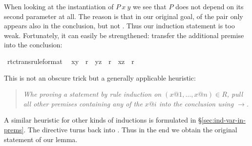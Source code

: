 \begin{isabellebody}
\begin{isamarkuptext}
When looking at the instantiation of $P~x~y$ we see
that $P$ does not depend on its second parameter at
all. The reason is that in our original goal, of the pair  only
 appears also in the conclusion, but not . Thus our
induction statement is too weak. Fortunately, it can easily be strengthened:
transfer the additional premise  into the conclusion:%
\end{isamarkuptext}%
\ rtc{\isacharunderscore}trans{\isacharbrackleft}rule{\isacharunderscore}format{\isacharbrackright}{\isacharcolon}\isanewline
\ \ {\isachardoublequote}{\isacharparenleft}x{\isacharcomma}y{\isacharparenright}\ {\isasymin}\ r{\isacharasterisk}\ {\isasymLongrightarrow}\ {\isacharparenleft}y{\isacharcomma}z{\isacharparenright}\ {\isasymin}\ r{\isacharasterisk}\ {\isasymlongrightarrow}\ {\isacharparenleft}x{\isacharcomma}z{\isacharparenright}\ {\isasymin}\ r{\isacharasterisk}{\isachardoublequote}%
\begin{isamarkuptxt}%
\noindent
This is not an obscure trick but a generally applicable heuristic:
\begin{quote}\em
Whe proving a statement by rule induction on $(x@1,\dots,x@n) \in R$,
pull all other premises containing any of the $x@i$ into the conclusion
using $\longrightarrow$.
\end{quote}
A similar heuristic for other kinds of inductions is formulated in
\S\ref{sec:ind-var-in-prems}. The  directive turns
\isa{{\isasymlongrightarrow}} back into \isa{{\isasymLongrightarrow}}. Thus in the end we obtain the original
statement of our lemma.


\end{isamarkuptxt}
\end{isabellebody}
